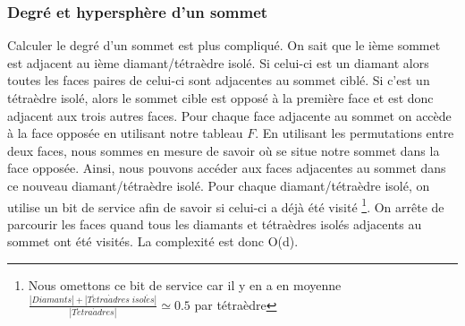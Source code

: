 \documentclass[a4paper,11pt,openany]{article}
\begin{document}
\subsubsection{Degré et hypersphère d'un sommet}
\noindent
Calculer le degré d'un sommet est plus compliqué. On sait que le ième sommet est adjacent au ième diamant/tétraèdre isolé. Si celui-ci est un diamant alors toutes les faces paires de celui-ci sont adjacentes au sommet ciblé. Si c'est un tétraèdre isolé, alors le sommet cible est opposé à la première face et est donc adjacent aux trois autres faces. Pour chaque face adjacente au sommet on accède à la face opposée en utilisant notre tableau $F$. En utilisant les permutations entre deux faces, nous sommes en mesure de savoir où se situe notre sommet dans la face opposée. Ainsi, nous pouvons accéder aux faces adjacentes au sommet dans ce nouveau diamant/tétraèdre isolé. Pour chaque diamant/tétraèdre isolé, on utilise un bit de service afin de savoir si celui-ci a déjà été visité \footnote{Nous omettons ce bit de service car il y en a en moyenne $\frac{|Diamants| + |T\acute{e}tra\grave{a}dres \; isol\acute{e}s|}{|T\acute{e}tra\grave{a}dres|}\simeq 0.5$ par tétraèdre}. On arrête de parcourir les faces quand tous les diamants et tétraèdres isolés adjacents au sommet ont été visités. La complexité est donc O(d).
\end{document}
